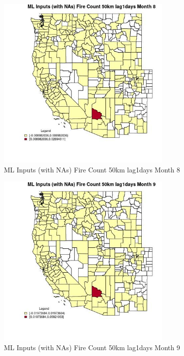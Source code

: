 \begin{figure} 
\centering  
\includegraphics[width=0.77\textwidth]{Code_Outputs/Report_ML_input_PM25_Step4_part_e_de_duplicated_aves_compiled_2019-05-20wNAs_CountyFire_Count_50km_lag1daysmedianMonth8.jpg} 
\caption{\label{fig:Report_ML_input_PM25_Step4_part_e_de_duplicated_aves_compiled_2019-05-20wNAsCountyFire_Count_50km_lag1daysmedianMonth8}ML Inputs (with NAs) Fire Count 50km lag1days Month 8} 
\end{figure} 
 

\begin{figure} 
\centering  
\includegraphics[width=0.77\textwidth]{Code_Outputs/Report_ML_input_PM25_Step4_part_e_de_duplicated_aves_compiled_2019-05-20wNAs_CountyFire_Count_50km_lag1daysmedianMonth9.jpg} 
\caption{\label{fig:Report_ML_input_PM25_Step4_part_e_de_duplicated_aves_compiled_2019-05-20wNAsCountyFire_Count_50km_lag1daysmedianMonth9}ML Inputs (with NAs) Fire Count 50km lag1days Month 9} 
\end{figure} 
 

